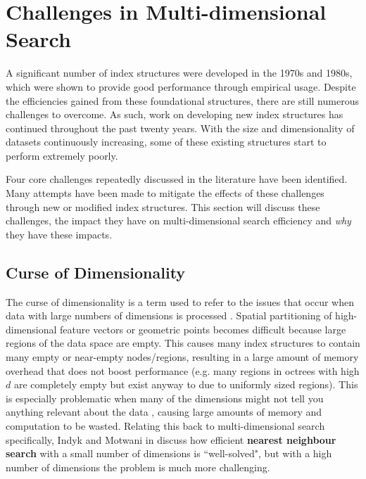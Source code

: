 \section{Challenges in Multi-dimensional Search}
\label{sec:challenges}

A significant number of index structures were developed in the 1970s and 1980s, which were shown to provide good performance through empirical usage. Despite the efficiencies gained from these foundational structures, there are still numerous challenges to overcome. As such, work on developing new index structures has continued throughout the past twenty years. With the size and dimensionality of datasets continuously increasing, some of these existing structures start to perform extremely poorly.

Four core challenges repeatedly discussed in the literature have been identified. Many attempts have been made to mitigate the effects of these challenges through new or modified index structures. This section will discuss these challenges, the impact they have on multi-dimensional search efficiency and \textit{why} they have these impacts.

\subsection{Curse of Dimensionality}
\label{sec:curse-of-dimensionality}

The curse of dimensionality is a term used to refer to the issues that occur when data with large numbers of dimensions is processed \cite{curse-of-dimensionality}. Spatial partitioning of high-dimensional feature vectors or geometric points becomes difficult because large regions of the data space are empty. This causes many index structures to contain many empty or near-empty nodes/regions, resulting in a large amount of memory overhead that does not boost performance (e.g. many regions in octrees with high $d$ are completely empty but exist anyway to due to uniformly sized regions). This is especially problematic when many of the dimensions might not tell you anything relevant about the data \cite{irrelevant-dimension}, causing large amounts of memory and computation to be wasted. Relating this back to multi-dimensional search specifically, Indyk and Motwani in \cite{knn-curse-of-dimensionality} discuss how efficient \textbf{nearest neighbour search} with a small number of dimensions is ``well-solved", but with a high number of dimensions the problem is much more challenging.

